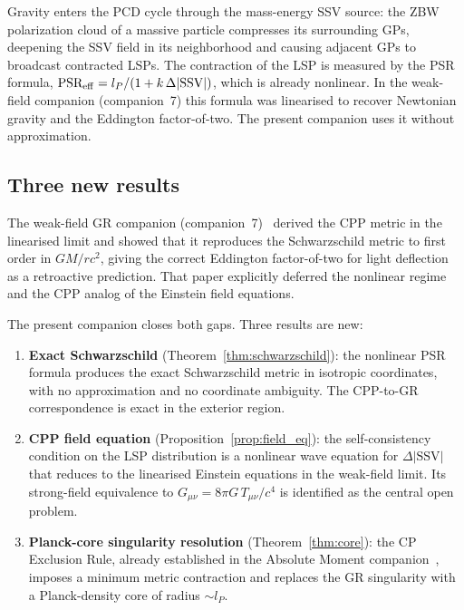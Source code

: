 \documentclass[12pt]{article}
\newcommand{\lP}{l_P}
\newcommand{\SSV}{\text{SSV}}
\newcommand{\PSR}{\text{PSR}}
\begin{document}
Gravity enters the PCD cycle through the mass-energy SSV source: the
ZBW polarization cloud of a massive particle compresses its surrounding
GPs, deepening the SSV field in its neighborhood and causing adjacent
GPs to broadcast contracted LSPs.  The contraction of the LSP is
measured by the PSR formula, $\PSR_{\rm eff} = \lP/(1+k\,\Delta|\SSV|)$,
which is already nonlinear.  In the weak-field companion (companion~7)
this formula was linearised to recover Newtonian gravity and the
Eddington factor-of-two.  The present companion uses it without
approximation.

\subsection*{Three new results}

The weak-field GR companion (companion~7)~\cite{c7} derived the CPP
metric in the linearised limit and showed that it reproduces the
Schwarzschild metric to first order in $GM/rc^2$, giving the correct
Eddington factor-of-two for light deflection as a retroactive
prediction.  That paper explicitly deferred the nonlinear regime and
the CPP analog of the Einstein field equations.

The present companion closes both gaps.  Three results are new:

\begin{enumerate}[noitemsep]
  \item \textbf{Exact Schwarzschild} (Theorem~\ref{thm:schwarzschild}):
    the nonlinear PSR formula produces the exact Schwarzschild metric
    in isotropic coordinates, with no approximation and no coordinate
    ambiguity.  The CPP-to-GR correspondence is exact in the exterior
    region.

  \item \textbf{CPP field equation}
    (Proposition~\ref{prop:field_eq}): the self-consistency condition
    on the LSP distribution is a nonlinear wave equation for
    $\Delta|\SSV|$ that reduces to the linearised Einstein equations
    in the weak-field limit.  Its strong-field equivalence to
    $G_{\mu\nu} = 8\pi G\,T_{\mu\nu}/c^4$ is identified as the central
    open problem.

  \item \textbf{Planck-core singularity resolution}
    (Theorem~\ref{thm:core}): the CP Exclusion Rule, already established
    in the Absolute Moment companion~\cite{c1}, imposes a minimum metric
    contraction and replaces the GR singularity with a Planck-density
    core of radius $\sim\lP$.
\end{enumerate}
\end{document}
